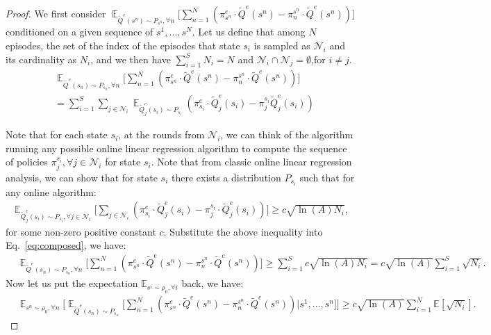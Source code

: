 \documentclass{article}
\begin{document}
\begin{proof}
We first consider $\mathop{\mathbb{E}}_{\tilde{Q}^e(s^n)\sim P_{s^n},\forall n}\big[\sum_{n=1}^N( \pi^e_{s^n} \cdot \tilde{Q}^e(s^n) - \pi_n^{s^n}\cdot \tilde{Q}^e(s^n))\big]$ conditioned on a given sequence of $s^1,...,s^N$.
Let us define that among $N$ episodes, the set of the index of the episodes that state $s_i$ is sampled as $\mathcal{N}_i$ and its cardinality as $N_i$, and we then have $\sum_{i=1}^S N_i = N$ and $\mathcal{N}_i \cap\mathcal{N}_j = \emptyset$,for $i\neq j$. 
\begin{align}
&\mathop{\mathbb{E}}_{\tilde{Q}^e(s_n)\sim P_{s_n},\forall n}\big[\sum_{n=1}^N( \pi^e_{s^n} \cdot \tilde{Q}^e(s^n) - \pi_n^{s^n}\cdot \tilde{Q}^e(s^n))\big] \nonumber\\
& = \sum_{i=1}^S \sum_{j\in \mathcal{N}_i} \mathop{\mathbb{E}}_{\tilde{Q}_j^e(s_i)\sim P_{s_i}}(\pi_{s_i}^e\cdot\tilde{Q}_j^e(s_i) - \pi_{j}^{s_i}\tilde{Q}_j^e(s_i))
\label{eq:composed}
\end{align}


Note that for each state $s_i$, at the rounds from $\mathcal{N}_i$, we can think of the algorithm running any possible online linear regression algorithm to compute the sequence of policies $\pi_j^{s_i},\forall j\in \mathcal{N}_i$ for state $s_i$. Note that from classic online linear regression analysis, we can show that for state $s_i$ there exists a distribution $P_{s_i}$ such that for any online algorithm:
\begin{align}
\mathop{\mathbb{E}}_{\tilde{Q}^e_j(s_i)\sim P_{s_i},\forall j\in\mathcal{N}_i}\big[ \sum_{j\in\mathcal{N}_i} (\pi_{s_i}^e \cdot \tilde{Q}_j^e(s_i) - \pi_{j}^{s_i}\cdot \tilde{Q}_j^e(s_i))  \big] \geq c\sqrt{\ln(A) N_i},
\end{align} for some non-zero positive constant $c$.
Substitute the above inequality into Eq.~\ref{eq:composed}, we have:
\begin{align}
&\mathop{\mathbb{E}}_{\tilde{Q}^e(s_n)\sim P_{s_n},\forall n}\big[\sum_{n=1}^N( \pi^e_{s^n} \cdot \tilde{Q}^e(s^n) - \pi_n^{s^n}\cdot \tilde{Q}^e(s^n))\big]\geq \sum_{i=1}^S c\sqrt{\ln(A)N_i} = c\sqrt{\ln(A)}\sum_{i=1}^S\sqrt{N_i}.
\end{align}
Now let us put the expectation $\mathbb{E}_{s^i\sim\rho_0,\forall i}$ back, we have:
\begin{align}
\label{eq:fact_1}
&\mathop{\mathbb{E}}_{s^n\sim\rho_0,\forall n}\Big[\mathop{\mathbb{E}}_{\tilde{Q}^e(s_n)\sim P_{s_n}}\big[\sum_{n=1}^N( \pi^e_{s^n} \cdot \tilde{Q}^e(s^n) - \pi_n^{s^n}\cdot \tilde{Q}^e(s^n))|s^1,...,s^n\big]\Big]\geq  c\sqrt{\ln(A)}\sum_{i=1}^N\mathbb{E}[\sqrt{N_i}].
\end{align}


\end{proof}
\end{document}
